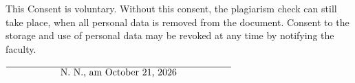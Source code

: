 \documentclass[12pt,oneside,a4paper,parskip]{scrbook}
\def\BaAuthor{Achim Winter}
\def\ShowBaAuthor{\BaAuthor}
\def\ShowBaAuthor{N.~N.}
\begin{document}
\begin{small}
This Consent is voluntary. Without this consent, the plagiarism check can still take place, when all personal data is removed from the document. Consent to the storage and use of personal data may be revoked at any time by notifying the faculty.
\end{small}

\vspace{20pt}
\begin{flushright}
$\overline{~~~~~~~~~~~~~~~~~\mbox{\ShowBaAuthor, am \today}~~~~~~~~~~~~~~~~~}$
\end{flushright}
\end{document}
